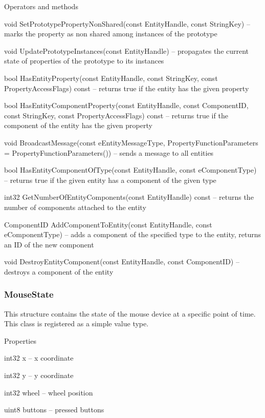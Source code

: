 \begin{titled-itemize}{Operators and methods}
  \item void SetPrototypePropertyNonShared(const EntityHandle, const String\-Key) -- marks the property as non shared among instances of the prototype
  \item void UpdatePrototypeInstances(const EntityHandle) -- propagates the current state of properties of the prototype to its instances
  \item bool HasEntityProperty(const EntityHandle, const StringKey, const PropertyAccessFlags) const -- returns true if the entity has the given property
  \item bool HasEntityComponentProperty(const EntityHandle, const ComponentID, const StringKey, const PropertyAccessFlags) const -- returns true if the component of the entity has the given property
  \item void BroadcastMessage(const eEntityMessageType, PropertyFunctionParameters = PropertyFunctionParameters()) -- sends a message to all entities
  \item bool HasEntityComponentOfType(const EntityHandle, const eComponentType) -- returns true if the given entity has a component of the given type
  \item int32 GetNumberOfEntityComponents(const EntityHandle) const -- returns the number of components attached to the entity
  \item ComponentID AddComponentToEntity(const EntityHandle, const e\-Com\-po\-nent\-Ty\-pe) -- adds a component of the specified type to the entity, returns an ID of the new component
  \item void DestroyEntityComponent(const EntityHandle, const Com\-po\-nent\-ID) -- destroys a component of the entity
\end{titled-itemize}

\subsubsection{MouseState}

This structure contains the state of the mouse device at a specific point of time. This class is registered as a simple value type.

\begin{titled-itemize}{Properties}
  \item int32 x -- x coordinate
  \item int32 y -- y coordinate
  \item int32 wheel -- wheel position
  \item uint8 buttons -- pressed buttons
\end{titled-itemize}

